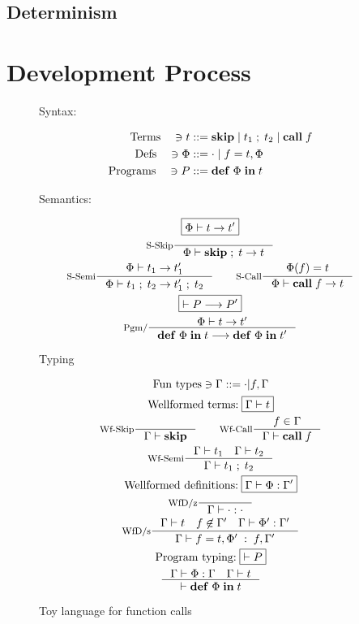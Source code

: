 \documentclass[a4paper, oneside, 10pt, draft]{memoir}
\begin{document}
\section{Determinism}
\chapter{Development Process}

\newcommand{\fskip}{\mathbf{skip}}
\newcommand{\fsemi}[2]{#1 \; ; \; #2}
\newcommand{\fcall}[1]{\mathbf{call} \; #1}
\newcommand{\fpgm}[2]{\mathbf{def} \; #1 \; \mathbf{in} \; #2}
\begin{figure}
  \begin{center}
    Syntax:
  \end{center}
  \begin{align*}
    \text{Terms} \quad \ni t & ::= \fskip{} \bor \fsemi{t_1}{t_2} \bor
    \fcall{f}\\
    \text{Defs} \quad \ni \Phi & ::= \cdot \bor f = t, \Phi\\
    \text{Programs} \quad \ni P & ::= \fpgm{\Phi}{t}
  \end{align*}
  \begin{center}
    Semantics:
  \end{center}
  \begin{gather*}
    \boxed{\Phi |- t -> t'}\\
    \inference[S-Skip]{}{\Phi |- \fsemi{\fskip{}}{t} -> t}\\
    \inference[S-Semi]{\Phi |- t_1 -> t'_1}{\Phi |- \fsemi{t_1}{t_2}
      -> \fsemi{t'_1}{t_2}} \quad \quad
    \inference[S-Call]{\Phi(f) = t}{\Phi |- \fcall{f} -> t}\\
    \boxed{|- P --> P'}\\
    \inference[Pgm/]{\Phi |- t -> t'}{\fpgm{\Phi}{t} --> \fpgm{\Phi}{t'}}
  \end{gather*}
  \begin{center}
    Typing
  \end{center}
  \begin{gather*}
    \text{Fun types} \ni \Gamma ::= \cdot | f,\Gamma\\
    \text{Wellformed terms:} \; \boxed{\Gamma |- t}\\
    \inference[Wf-Skip]{}{\Gamma |- \fskip{}} \quad \quad
    \inference[Wf-Call]{f \in \Gamma}{\Gamma |- \fcall{f}}\\
    \inference[Wf-Semi]{\Gamma |- t_1 \quad \Gamma |- t_2}{\Gamma |-
      \fsemi{t_1}{t_2}}\\
    \text{Wellformed definitions:} \; \boxed{\Gamma |- \Phi :
      \Gamma'}\\
    \inference[WfD/z]{}{\Gamma |- \cdot : \cdot}\\
    \inference[WfD/s]{\Gamma |- t \quad f \not \in \Gamma' \quad
      \Gamma |- \Phi' : \Gamma'}{\Gamma |- f = t, \Phi' \; : \;
      f,\Gamma'}\\
    \text{Program typing:} \; \boxed{|- P}\\
    \inference{\Gamma |- \Phi : \Gamma \quad \Gamma |- t}{|- \fpgm{\Phi}{t}}
  \end{gather*}
  \caption{Toy language for function calls}
  \label{fig:func-call-lang}
\end{figure}
\end{document}
